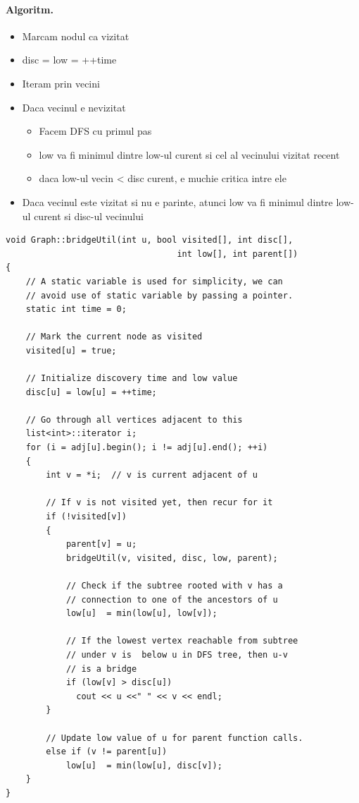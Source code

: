 \documentclass{article}
\begin{document}
\paragraph*{Algoritm.}
\begin{itemize}
    \item Marcam nodul ca vizitat
    \item disc = low = ++time
    \item Iteram prin vecini
    \item Daca vecinul e nevizitat
          \begin{itemize}
              \item Facem DFS cu primul pas
              \item low va fi minimul dintre low-ul curent si cel al vecinului vizitat recent
              \item daca low-ul vecin < disc curent, e muchie critica intre ele
          \end{itemize}
    \item Daca vecinul este vizitat si nu e parinte, atunci low va fi minimul dintre low-ul curent si disc-ul vecinului
\end{itemize}
\begin{lstlisting}
void Graph::bridgeUtil(int u, bool visited[], int disc[],
                                  int low[], int parent[])
{
    // A static variable is used for simplicity, we can
    // avoid use of static variable by passing a pointer.
    static int time = 0;
 
    // Mark the current node as visited
    visited[u] = true;
 
    // Initialize discovery time and low value
    disc[u] = low[u] = ++time;
 
    // Go through all vertices adjacent to this
    list<int>::iterator i;
    for (i = adj[u].begin(); i != adj[u].end(); ++i)
    {
        int v = *i;  // v is current adjacent of u
 
        // If v is not visited yet, then recur for it
        if (!visited[v])
        {
            parent[v] = u;
            bridgeUtil(v, visited, disc, low, parent);
 
            // Check if the subtree rooted with v has a
            // connection to one of the ancestors of u
            low[u]  = min(low[u], low[v]);
 
            // If the lowest vertex reachable from subtree
            // under v is  below u in DFS tree, then u-v
            // is a bridge
            if (low[v] > disc[u])
              cout << u <<" " << v << endl;
        }
 
        // Update low value of u for parent function calls.
        else if (v != parent[u])
            low[u]  = min(low[u], disc[v]);
    }
}
    \end{lstlisting}
\end{document}
